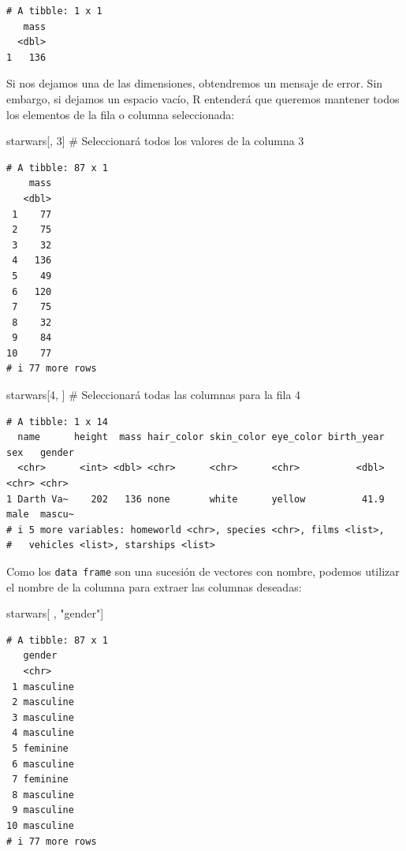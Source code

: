 \documentclass[
  letterpaper,
  DIV=11,
  numbers=noendperiod]{scrreprt}
\newenvironment{Shaded}{\begin{snugshade}}{\end{snugshade}}
\newcommand{\CommentTok}[1]{\textcolor[rgb]{0.37,0.37,0.37}{#1}}
\newcommand{\DecValTok}[1]{\textcolor[rgb]{0.68,0.00,0.00}{#1}}
\newcommand{\NormalTok}[1]{\textcolor[rgb]{0.00,0.23,0.31}{#1}}
\newcommand{\StringTok}[1]{\textcolor[rgb]{0.13,0.47,0.30}{#1}}
\begin{document}
\begin{verbatim}
# A tibble: 1 x 1
   mass
  <dbl>
1   136
\end{verbatim}

Si nos dejamos una de las dimensiones, obtendremos un mensaje de error.
Sin embargo, si dejamos un espacio vacío, R entenderá que queremos
mantener todos los elementos de la fila o columna seleccionada:

\begin{Shaded}
\begin{Highlighting}[]
\NormalTok{starwars[, }\DecValTok{3}\NormalTok{]   }\CommentTok{\# Seleccionará todos los valores de la columna 3}
\end{Highlighting}
\end{Shaded}

\begin{verbatim}
# A tibble: 87 x 1
    mass
   <dbl>
 1    77
 2    75
 3    32
 4   136
 5    49
 6   120
 7    75
 8    32
 9    84
10    77
# i 77 more rows
\end{verbatim}

\begin{Shaded}
\begin{Highlighting}[]
\NormalTok{starwars[}\DecValTok{4}\NormalTok{, ]   }\CommentTok{\# Seleccionará todas las columnas para la fila 4}
\end{Highlighting}
\end{Shaded}

\begin{verbatim}
# A tibble: 1 x 14
  name      height  mass hair_color skin_color eye_color birth_year sex   gender
  <chr>      <int> <dbl> <chr>      <chr>      <chr>          <dbl> <chr> <chr> 
1 Darth Va~    202   136 none       white      yellow          41.9 male  mascu~
# i 5 more variables: homeworld <chr>, species <chr>, films <list>,
#   vehicles <list>, starships <list>
\end{verbatim}

Como los \texttt{data\ frame} son una sucesión de vectores con nombre,
podemos utilizar el nombre de la columna para extraer las columnas
deseadas:

\begin{Shaded}
\begin{Highlighting}[]
\NormalTok{starwars[ , }\StringTok{"gender"}\NormalTok{]}
\end{Highlighting}
\end{Shaded}

\begin{verbatim}
# A tibble: 87 x 1
   gender   
   <chr>    
 1 masculine
 2 masculine
 3 masculine
 4 masculine
 5 feminine 
 6 masculine
 7 feminine 
 8 masculine
 9 masculine
10 masculine
# i 77 more rows
\end{verbatim}
\end{document}
